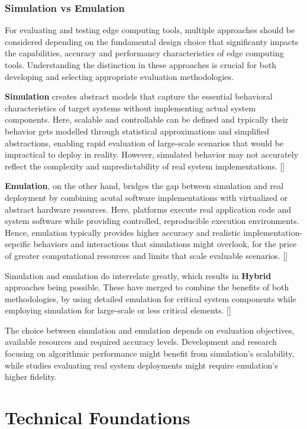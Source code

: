 \subsubsection{Simulation vs Emulation}
For evaluating and testing edge computing tools, multiple approaches should be considered depending on the fundamental design choice that significanty impacts the capabilities, accuracy and performancy characteristics of edge computing tools.
Understanding the distinction in these approaches is crucial for both developing and selecting appropriate evaluation methodologies.

\textbf{Simulation} creates abstract models that capture the essential behavioral characteristics of target systems without implementing actual system components.
Here, scalable and controllable can be defined and typically their behavior gets modelled through statistical approximations and simplified abstractions, enabling rapid evaluation of large-scale scenarios that would be impractical to deploy in reality.
However, simulated behavior may not accurately reflect the complexity and unpredictability of real system implementations. [\cite{inproceedings-sim-vs-emu}]

\textbf{Emulation}, on the other hand, bridges the gap between simulation and real deployment by combining acutal software implementations with virtualized or abstract hardware resources.
Here, platforms execute real application code and system software while providing controlled, reproducible execution environments.
Hence, emulation typically provides higher accuracy and realistic implementation-sepcific behaviors and interactions that simulations might overlook, for the price of greater computational resources and limits that scale evaluable scenarios. [\cite{inproceedings-sim-vs-emu}]

Simulation and emulation do interrelate greatly, which results in \textbf{Hybrid} approaches being possible.
These have merged to combine the benefits of both methodologies, by using detailed emulation for critical system components while employing simulation for large-scale or less critical elements. [\cite{inproceedings-sim-vs-emu}]

The choice between simulation and emulation depends on evaluation objectives, available resources and required accuracy levels.
Development and research focusing on algorithmic performance might benefit from simulation's scalability, while studies evaluating real system deployments might require emulation's higher fidelity.


\section{Technical Foundations}
